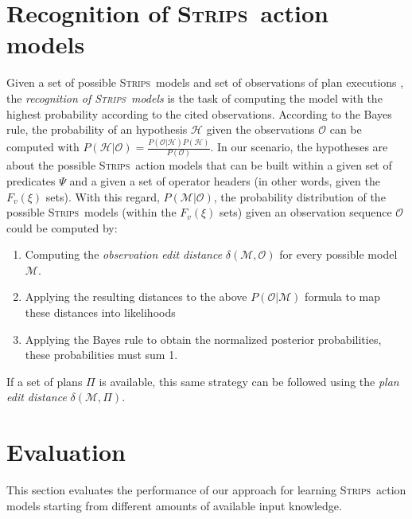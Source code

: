 \documentclass[3p,times]{elsarticle}
\newcommand{\strips}{\textsc{Strips}}     %
\begin{document}
\section{Recognition of \strips\ action models}
\label{sec:Section7}
Given a set of possible \strips\ models and set of observations of plan executions , the {\em recognition of \strips\ models} is the task of computing the model with the highest probability according to the cited observations. According to the Bayes rule, the probability of an hypothesis $\mathcal{H}$ given the observations $\mathcal{O}$ can be computed with $P(\mathcal{H}|\mathcal{O})=\frac{P(\mathcal{O}|\mathcal{H})P(\mathcal{H})}{P(\mathcal{O})}$. In our scenario, the hypotheses are about the possible \strips\ action models that can be built within a given set of predicates $\Psi$ and a given a set of operator headers (in other words, given the $F_v(\xi)$ sets). With this regard, $P(\mathcal{M}|\mathcal{O})$, the probability distribution of the possible \strips\ models (within the $F_v(\xi)$ sets) given an observation sequence $\mathcal{O}$ could be computed by:
\begin{enumerate}
\item Computing the {\em observation edit distance} $\delta(\mathcal{M},\mathcal{O})$ for every possible model $\mathcal{M}$.
\item Applying the resulting distances to the above $P(\mathcal{O}|\mathcal{M})$ formula to map these distances into likelihoods
\item Applying the Bayes rule to obtain the normalized posterior probabilities, these probabilities must sum 1.
\end{enumerate}

If a set of plans $\Pi$ is available, this same strategy can be followed using the {\em plan edit distance} $\delta(\mathcal{M},\Pi)$.



\section{Evaluation}
\label{sec:Section8}
This section evaluates the performance of our approach for learning \strips\ action models starting from different amounts of available input knowledge.
\end{document}
